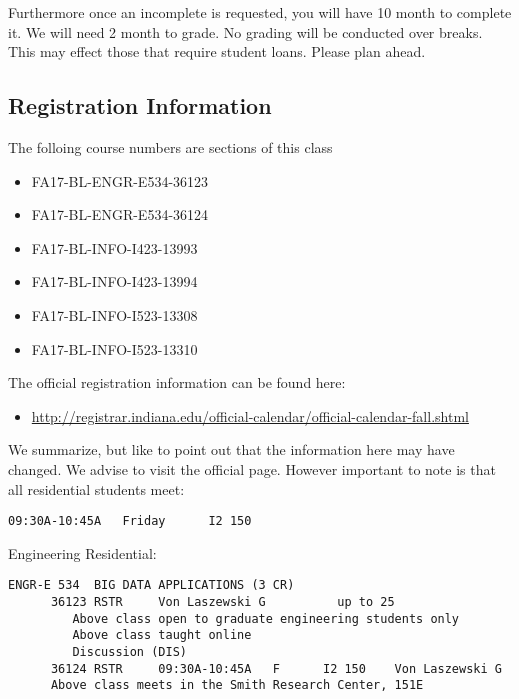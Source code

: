 Furthermore once an incomplete is requested, you will have 10 month to
complete it. We will need 2 month to grade. No grading will be conducted
over breaks. This may effect those that require student loans. Please
plan ahead.

\subsection{Registration Information}\label{registration-information}

The folloing course numbers are sections of this class

\begin{itemize}
\tightlist
\item
  FA17-BL-ENGR-E534-36123
\item
  FA17-BL-ENGR-E534-36124
\item
  FA17-BL-INFO-I423-13993
\item
  FA17-BL-INFO-I423-13994
\item
  FA17-BL-INFO-I523-13308
\item
  FA17-BL-INFO-I523-13310
\end{itemize}

The official registration information can be found here:

\begin{itemize}
\tightlist
\item
  \url{http://registrar.indiana.edu/official-calendar/official-calendar-fall.shtml}
\end{itemize}

We summarize, but like to point out that the information here may have
changed. We advise to visit the official page. However important to note
is that all residential students meet:

\begin{verbatim}
09:30A-10:45A   Friday      I2 150 
\end{verbatim}

Engineering Residential:

\begin{verbatim}
ENGR-E 534  BIG DATA APPLICATIONS (3 CR)
      36123 RSTR     Von Laszewski G          up to 25
         Above class open to graduate engineering students only
         Above class taught online
         Discussion (DIS)
      36124 RSTR     09:30A-10:45A   F      I2 150    Von Laszewski G
      Above class meets in the Smith Research Center, 151E
\end{verbatim}

